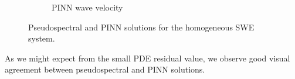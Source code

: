 \begin{figure}[h]
\begin{subfigure}[b]{0.45\textwidth}
        \caption{PINN wave velocity}
        \label{fig:homogeneous_pinn_swe_velocity}
    \end{subfigure}
    \caption{Pseudospectral and PINN solutions for the homogeneous SWE system.}
    \label{fig:homogeneous_swe_solution}
\end{figure}

As we might expect from the small PDE residual value, we observe good visual agreement between pseudospectral and PINN 
solutions.